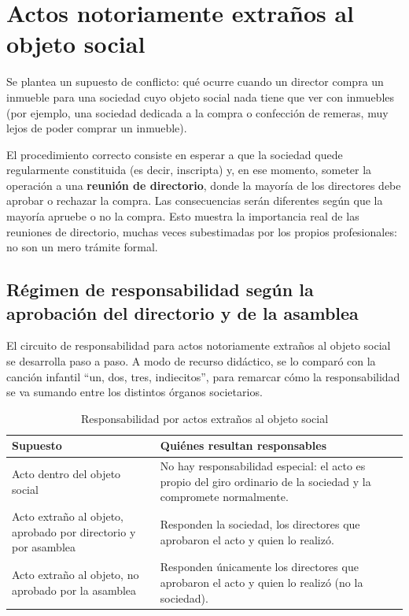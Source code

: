 \documentclass[12pt,oneside]{book}
\begin{document}
\section{Actos notoriamente extraños al objeto social}
\label{sec:extranos}

Se plantea un supuesto de conflicto: qué ocurre cuando un director compra un inmueble para una sociedad cuyo objeto social nada tiene que ver con inmuebles (por ejemplo, una sociedad dedicada a la compra o confección de remeras, muy lejos de poder comprar un inmueble).

El procedimiento correcto consiste en esperar a que la sociedad quede regularmente constituida (es decir, inscripta) y, en ese momento, someter la operación a una \textbf{reunión de directorio}, donde la mayoría de los directores debe aprobar o rechazar la compra. Las consecuencias serán diferentes según que la mayoría apruebe o no la compra. Esto muestra la importancia real de las reuniones de directorio, muchas veces subestimadas por los propios profesionales: no son un mero trámite formal.

\subsection{Régimen de responsabilidad según la aprobación del directorio y de la asamblea}

El circuito de responsabilidad para actos notoriamente extraños al objeto social se desarrolla paso a paso. A modo de recurso didáctico, se lo comparó con la canción infantil ``un, dos, tres, indiecitos'', para remarcar cómo la responsabilidad se va sumando entre los distintos órganos societarios.

\begin{table}[H]
\centering
\caption{Responsabilidad por actos extraños al objeto social}
\renewcommand{\arraystretch}{1.25}
\begin{tabularx}{\textwidth}{
    >{\raggedright\arraybackslash}p{}
    >{\raggedright\arraybackslash}X
}
\toprule
\textbf{Supuesto} & \textbf{Quiénes resultan responsables} \\
\midrule
Acto dentro del objeto social & No hay responsabilidad especial: el acto es propio del giro ordinario de la sociedad y la compromete normalmente. \\
Acto extraño al objeto, aprobado por directorio y por asamblea & Responden la sociedad, los directores que aprobaron el acto y quien lo realizó. \\
Acto extraño al objeto, no aprobado por la asamblea & Responden únicamente los directores que aprobaron el acto y quien lo realizó (no la sociedad). \\
\bottomrule
\end{tabularx}
\end{table}
\end{document}
